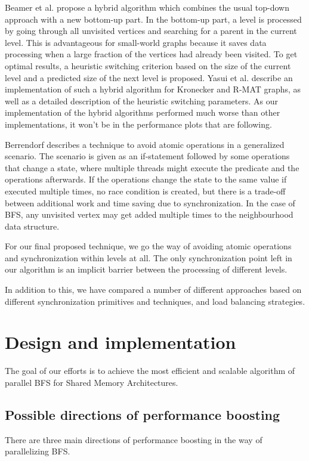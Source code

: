 \documentclass[letterpaper]{article}
\begin{document}
		Beamer et al.\cite{beamer2011searching} propose a hybrid algorithm which combines the usual top-down approach with a new bottom-up part. 
		In the bottom-up part, a level is processed by going through all unvisited vertices and searching for a parent in the current level. 
		This is advantageous for small-world graphs because it saves data processing when a large fraction of the vertices had already been visited. 
		To get optimal results, a heuristic switching criterion based on the size of the current level and a predicted size of the next level is proposed. 
		Yasui et al.\cite{6691600} describe an implementation of such a hybrid algorithm for Kronecker and R-MAT graphs, as well as a detailed description of the heuristic switching parameters.
		As our implementation of the hybrid algorithms performed much worse than other implementations, it won't be in the performance plots that are following.
	
		Berrendorf\cite{Berrendorf:14} describes a technique to avoid atomic operations in a generalized scenario. 
		The scenario is given as an if-statement followed by some operations that change a state, where multiple threads might execute the predicate and the operations afterwards. 
		If the operations change the state to the same value if executed multiple times, no race condition is created, but there is a trade-off between additional work and time saving due to synchronization.
		In the case of BFS, any unvisited vertex may get added multiple times to the neighbourhood data structure.		
	
		For our final proposed technique, we go the way of avoiding atomic operations and synchronization within levels at all.
		The only synchronization point left in our algorithm is an implicit barrier between the processing of different levels.
		
		In addition to this, we have compared a number of different approaches based on different synchronization primitives and techniques, and load balancing strategies.
	
	
	\section{Design and implementation}\label{sec:deim} %
		The goal of our efforts is to achieve the most efficient and scalable algorithm of parallel BFS for Shared Memory Architectures. 

		\subsection{Possible directions of performance boosting}
			There are three main directions of performance boosting in the way of parallelizing BFS.
			
\end{document}
